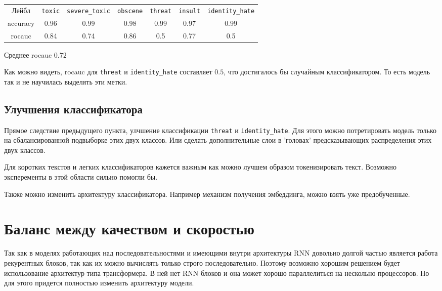 \documentclass[11pt,a4paper]{article}
\theoremstyle{remark}
\begin{document}
	\begin{center}
		\begin{tabular}{ c | c | c | c | c | c | c |}
			Лейбл & \verb|toxic| & \verb|severe_toxic| & \verb|obscene| & \verb|threat| & \verb|insult| & \verb|identity_hate| \\
			accuracy & 0.96 & 0.99 & 0.98 & 0.99 & 0.97 & 0.99 \\
			rocauc & 0.84 & 0.74 & 0.86 & 0.5 & 0.77 & 0.5 \\
		\end{tabular}
	\end{center}
	
	Среднее rocauc $0.72$
	
	
	Как можно видеть, rocauc для \verb|threat| и \verb|identity_hate| составляет $0.5$, что достигалось бы случайным классификатором. То есть модель так и не научилась выделять эти метки.
	
	
	\subsection*{Улучшения классификатора}

	Прямое следствие предыдущего пункта, улчшение классификации \verb|threat| и \verb|identity_hate|. Для этого можно потретировать модель только на сбалансированной подвыборке этих двух классов. Или сделать дополнительные слои в 'головах' предсказывающих распределения этих двух классов.

	Для коротких текстов и легких классификаторов кажется важным как можно лучшем образом токенизировать текст. Возможно эксперементы в этой области сильно помогли бы.
	
	Также можно изменить архитектуру классификатора. Например механизм получения эмбеддинга, можно взять уже предобученные.
	

	\section{Баланс между качеством и скоростью}
	
	 Так как в моделях работающих над последовательностями и имеющими внутри архитектуры RNN довольно долгой частью является работа рекурентных блоков, так как их можно вычислять только строго последовательно. Поэтому возможно хорошим решением будет использование архитектур типа трансформера. В ней нет RNN блоков и она может хорошо параллелиться на нескольно процессоров. Но для этого придется полностью изменить архитектуру модели.
	 
\end{document}
